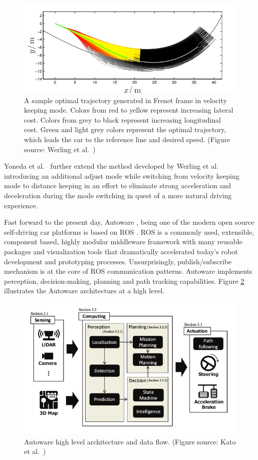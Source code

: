 \begin{figure}[h]
  \centering
  \includegraphics[width=.8\textwidth]{figures/frenet-velocity-keeping.png}
  \caption[A sample optimal trajectory generated in Frenet frame]{A sample
    optimal trajectory generated in Frenet frame in velocity keeping mode.
    Colors from red to yellow represent increasing lateral cost. Colors from
    grey to black represent increasing longitudinal cost. Green and light grey
    colors represent the optimal trajectory, which leads the car to the
    reference line and desired speed. (Figure source: Werling et al.\
    \cite{Werling2010OptimalTG})}
  \label{figure:frenet-velocity-keeping}
\end{figure}

Yoneda et al.\ \cite{Yoneda2018TrajectoryOA} further extend the method developed
by Werling et al.\ \cite{Werling2010OptimalTG} introducing an additional adjust
mode while switching from velocity keeping mode to distance keeping in an
effort to eliminate strong acceleration and deceleration during the mode
switching in quest of a more natural driving experience.

Fast forward to the present day, Autoware \cite{Kato2018AutowareOB}, being one
of the modern open source self-driving car platforms is based on ROS
\cite{Quigley2009ROSAO}. ROS is a commonly used, extensible, component based,
highly modular middleware framework with many reusable packages and
visualization tools that dramatically accelerated today's robot development and
prototyping processes. Unsurprisingly, publish/subscribe mechanism is at the
core of ROS communication patterns. Autoware implements perception,
decision-making, planning and path tracking capabilities. Figure
\ref{figure:autoware} illustrates the Autoware architecture at a high
level.

\begin{figure}[h]
  \centering
  \includegraphics[width=.8\textwidth]{figures/autoware.png}
  \caption[Autoware high level architecture]{Autoware high level architecture
    and data flow. (Figure source: Kato et al.\ \cite{Kato2018AutowareOB})}
  \label{figure:autoware}
\end{figure}

